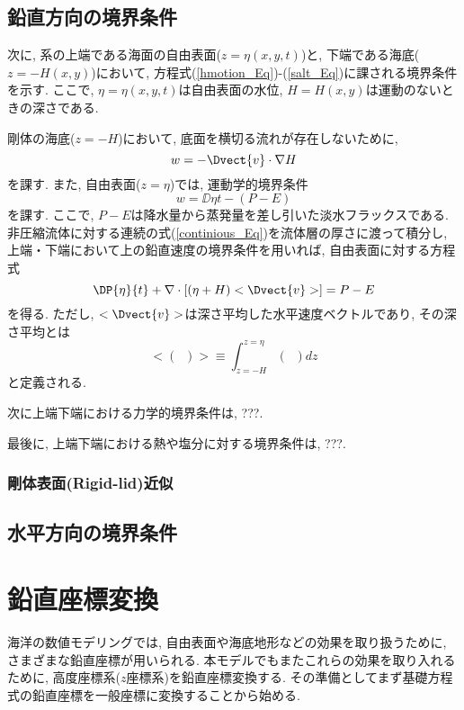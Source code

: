 \documentclass[a4j,12pt,openbib,oneside]{jreport}
\begin{document}
\subsection{鉛直方向の境界条件}
次に, 系の上端である海面の自由表面($z=\eta(x,y,t)$)と, 下端である海底($z=-H(x,y)$)において,  
方程式(\ref{hmotion_Eq})-(\ref{salt_Eq})に課される境界条件を示す. 
ここで, $\eta=\eta(x,y,t)$は自由表面の水位, $H=H(x,y)$は運動のないときの深さである. 

剛体の海底($z=-H$)において, 底面を横切る流れが存在しないために, 
\begin{equation*}
  w= - \Dvect{v}\cdot\nabla H
\end{equation*}
を課す. 
また, 自由表面($z=\eta$)では, 運動学的境界条件
\begin{equation}
 w = \DD{\eta}{t} - (P-E)
\end{equation}
を課す. 
ここで, $P-E$は降水量から蒸発量を差し引いた淡水フラックスである. 
非圧縮流体に対する連続の式(\ref{continious_Eq})を流体層の厚さに渡って積分し,  
上端・下端において上の鉛直速度の境界条件を用いれば, 
自由表面に対する方程式
\begin{equation}
 \DP{\eta}{t} + \nabla \cdot \left[ (\eta+H) <\Dvect{v}> \right] = P-E
\end{equation}
を得る. 
ただし, $<\Dvect{v}>$は深さ平均した水平速度ベクトルであり, 
その深さ平均とは
\begin{equation}
 <(\;\;)> \equiv \int_{z=-H}^{z=\eta} (\;\;) dz
\end{equation}
と定義される. 

次に上端下端における力学的境界条件は, ???.

最後に, 上端下端における熱や塩分に対する境界条件は, ???.

\subsubsection*{剛体表面(Rigid-lid)近似}

\subsection{水平方向の境界条件}

\section{鉛直座標変換}
海洋の数値モデリングでは, 自由表面や海底地形などの効果を取り扱うために,
さまざまな鉛直座標が用いられる. 
本モデルでもまたこれらの効果を取り入れるために, 高度座標系($z$座標系)を鉛直座標変換する. 
その準備としてまず基礎方程式の鉛直座標を一般座標に変換することから始める. 
\end{document}
